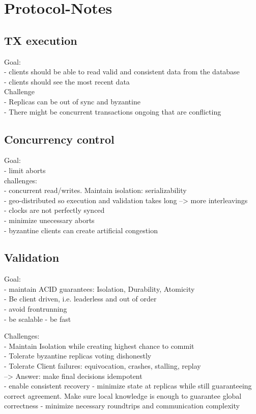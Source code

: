 \section{Protocol-Notes}

\subsection{TX execution}
Goal:\\
- clients should be able to read valid and consistent data from the database\\
- clients should see the most recent data\\


Challenge\\
- Replicas can be out of sync and byzantine\\
- There might be concurrent transactions ongoing that are conflicting\\



\subsection{Concurrency control}
Goal: \\
- limit aborts\\

challenges:\\
- concurrent read/writes. Maintain isolation: serializability\\
- geo-distributed so execution and validation takes long --> more interleavings\\
- clocks are not perfectly synced\\
- minimize unecessary aborts\\
- byzantine clients can create artificial congestion\\


\subsection{Validation}
Goal:\\
- maintain ACID guarantees: Isolation, Durability, Atomicity\\
- Be client driven, i.e. leaderless and out of order\\
- avoid frontrunning\\
- be scalable
- be fast

Challenges:\\
- Maintain Isolation while creating highest chance to commit\\
- Tolerate byzantine replicas voting dishonestly\\
- Tolerate Client failures: equivocation, crashes, stalling, replay\\
--> Answer: make final decisions idempotent\\
- enable consistent recovery
- minimize state at replicas while still guaranteeing correct agreement. Make sure local knowledge is enough to guarantee global correctness
- minimize necessary roundtrips and communication complexity




